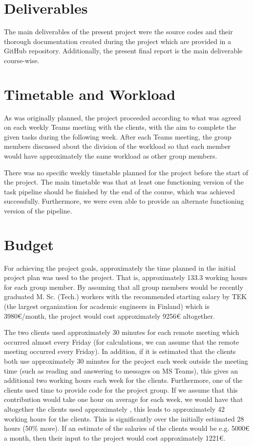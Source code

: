 \section{Deliverables}

The main deliverables of the present project were the source codes and their thorough documentation created during the project which are provided in a GitHub repository. Additionally, the present final report is the main deliverable course-wise.

\section{Timetable and Workload}

As was originally planned, the project proceeded according to what was agreed on each weekly Teams meeting with the clients, with the aim to complete the given tasks during the following week. After each Teams meeting, the group members discussed about the division of the workload so that each member would have approximately the same workload as other group members.

There was no specific weekly timetable planned for the project before the start of the project. The main timetable was that at least one functioning version of the task pipeline should be finished by the end of the course, which was achieved successfully. Furthermore, we were even able to provide an alternate functioning version of the pipeline.

\section{Budget}

For achieving the project goals, approximately the time planned in the initial project plan was used to the project. That is, approximately 133.3 working hours for each group member. By assuming that all group members would be recently graduated M. Sc. (Tech.) workers with the recommended starting salary by TEK (the largest organization for academic engineers in Finland) which is 3980{\euro}/month, the project would cost approximately 9256{\euro} altogether.

The two clients used approximately 30 minutes for each remote meeting which occurred almost every Friday (for calculations, we can assume that the remote meeting occurred every Friday). In addition, if it is estimated that the clients both use approximately 30 minutes for the project each week outside the meeting time (such as reading and answering to messages on MS Teams), this gives an additional two working hours each week for the clients. Furthermore, one of the clients used time to provide code for the project group. If we assume that this contribution would take one hour on average for each week, we would have that altogether the clients used approximately , this leads to approximately 42 working hours for the clients. This is significantly over the initially estimated 28 hours (50\% more). If an estimate of the salaries of the clients would be e.g. 5000{\euro} a month, then their input to the project would cost approximately 1221{\euro}.

